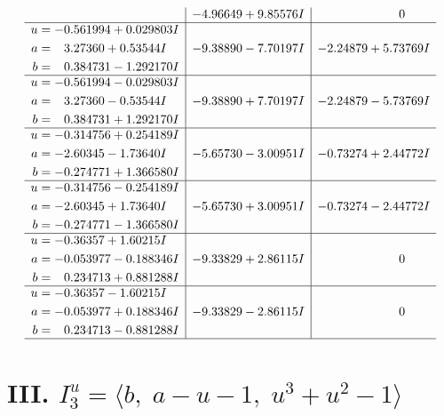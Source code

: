 \documentclass[1p]{elsarticle_modified}
\theoremstyle{definition}
\begin{document}
$$\begin{array}{c|c|c}
 & -4.96649 + 9.85576 I & \phantom{-0.000000 } 0 \\ \hline\begin{aligned}
u &= -0.561994 + 0.029803 I \\
a &= \phantom{-}3.27360 + 0.53544 I \\
b &= \phantom{-}0.384731 - 1.292170 I\end{aligned}
 & -9.38890 - 7.70197 I & -2.24879 + 5.73769 I \\ \hline\begin{aligned}
u &= -0.561994 - 0.029803 I \\
a &= \phantom{-}3.27360 - 0.53544 I \\
b &= \phantom{-}0.384731 + 1.292170 I\end{aligned}
 & -9.38890 + 7.70197 I & -2.24879 - 5.73769 I \\ \hline\begin{aligned}
u &= -0.314756 + 0.254189 I \\
a &= -2.60345 - 1.73640 I \\
b &= -0.274771 + 1.366580 I\end{aligned}
 & -5.65730 - 3.00951 I & -0.73274 + 2.44772 I \\ \hline\begin{aligned}
u &= -0.314756 - 0.254189 I \\
a &= -2.60345 + 1.73640 I \\
b &= -0.274771 - 1.366580 I\end{aligned}
 & -5.65730 + 3.00951 I & -0.73274 - 2.44772 I \\ \hline\begin{aligned}
u &= -0.36357 + 1.60215 I \\
a &= -0.053977 - 0.188346 I \\
b &= \phantom{-}0.234713 + 0.881288 I\end{aligned}
 & -9.33829 + 2.86115 I & \phantom{-0.000000 } 0 \\ \hline\begin{aligned}
u &= -0.36357 - 1.60215 I \\
a &= -0.053977 + 0.188346 I \\
b &= \phantom{-}0.234713 - 0.881288 I\end{aligned}
 & -9.33829 - 2.86115 I & \phantom{-0.000000 } 0\\
 \hline 
 \end{array}$$\newpage\newpage\renewcommand{\arraystretch}{1}
\centering \section*{III. $I^u_{3}= \langle b,\;a- u-1,\;u^3+u^2-1 \rangle$}
\end{document}
